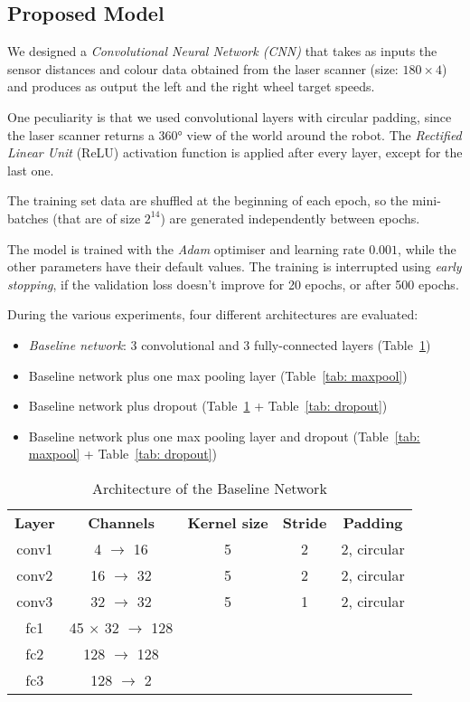 \subsection{Proposed Model}
\label{sec:models}

We designed a \emph{Convolutional Neural Network (CNN)} that takes as inputs 
the sensor distances and colour data obtained from the laser scanner 
(size: $180 \times 4$) and produces as output the left and the right wheel 
target speeds. 

One peculiarity is that we used convolutional layers with circular padding, 
since the laser scanner returns a 360° view of the world around the robot. The 
\emph{Rectified Linear Unit} (ReLU) activation function is applied after every 
layer, except for the last one. 

The training set data are shuffled at the beginning of each epoch, so the 
mini-batches (that are of size $2^{14}$) are generated independently between 
epochs. 

The model is trained with the \emph{Adam} optimiser and learning rate $0.001$, 
while the other parameters have their default values. The training is 
interrupted using \emph{early stopping}, if the validation loss doesn't improve 
for 20 epochs, or after 500 epochs. 

During the various experiments, four different architectures are evaluated:
\begin{itemize}
	\item \emph{Baseline network}: 3 convolutional and 3 fully-connected
	layers (Table~\ref{tab: baseline})
	\item Baseline network plus one max pooling layer (Table~\ref{tab: maxpool})
	\item Baseline network plus dropout (Table~\ref{tab: baseline} + 
	Table~\ref{tab: dropout})
	\item Baseline network plus one max pooling layer and dropout 
	(Table~\ref{tab: maxpool} + Table~\ref{tab: dropout})
\end{itemize} 

\begin{table}[htbp]
	\caption{Architecture of the Baseline Network}
	\begin{center}
		\begin{tabular}{|c|c|c|c|c|}
			\hline
			\textbf{Layer}&\textbf{Channels} &\textbf{Kernel size} &\textbf{Stride} &\textbf{Padding}\\
			\cline{1-5}
			conv1 &  4 $\rightarrow$ 16 & 5 & 2 & 2, circular \\ \hline
			conv2 & 16 $\rightarrow$ 32 & 5 & 2 & 2, circular \\ \hline
			conv3 & 32 $\rightarrow$  			 32 & 5 & 1 & 2, circular \\ \hline
			fc1 &   45 $\times$ 32 $\rightarrow$ 128 &  &  &  \\ \hline
			fc2 &  128 $\rightarrow$ 128 &  &  &  \\ \hline
			fc3 &  128 $\rightarrow$   2 &  &  &  \\ \hline
		\end{tabular}
		\label{tab: baseline}
	\end{center}
\end{table}

